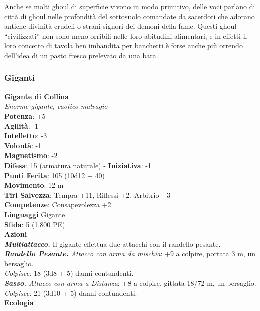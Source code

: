 \begin{multicols}{2}
Anche se molti ghoul di superficie vivono in modo primitivo, delle voci parlano di città di ghoul nelle profondità del sottosuolo comandate da sacerdoti che adorano antiche divinità crudeli o strani signori dei demoni della fame. Questi ghoul “civilizzati” non sono meno orribili nelle loro abitudini alimentari, e in effetti il loro concetto di tavola ben imbandita per banchetti è forse anche più orrendo dell’idea di un pasto fresco prelevato da una bara.\\

\subsubsection{Giganti}

\medskip\textbf{Gigante di Collina}\\
\emph{Enorme gigante, caotico malvagio}\\
\textbf{Potenza}: +5\\
\textbf{Agilità}: -1\\
\textbf{Intelletto}: -3\\
\textbf{Volontà}: -1\\
\textbf{Magnetismo}: -2\\
\textbf{Difesa}: 15 (armatura naturale) - \textbf{Iniziativa}: -1\\
\textbf{Punti Ferita}: 105 (10d12 + 40)\\
\textbf{Movimento}: 12 m\\
\textbf{Tiri Salvezza}: Tempra +11, Riflessi +2, Arbitrio +3\\
\textbf{Competenze}: Consapevolezza +2\\
\textbf{Linguaggi} Gigante\\
\textbf{Sfida}: 5 (1.800 PE)\smallskip\\
\smallskip\textbf{Azioni}\\
\emph{\textbf{Multiattacco.}} Il gigante effettua due attacchi con il randello pesante.\\
\emph{\textbf{Randello Pesante.} Attacco con arma da mischia}: +9 a colpire, portata 3 m, un bersaglio.\\
\emph{Colpisce:} 18 (3d8 + 5) danni contundenti.\\
\emph{\textbf{Sasso.} Attacco con arma a Distanza}: +8 a colpire, gittata 18/72 m, un bersaglio.\\
\emph{Colpisce:} 21 (3d10 + 5) danni contundenti.\\
\textbf{Ecologia}\\

\end{multicols}

